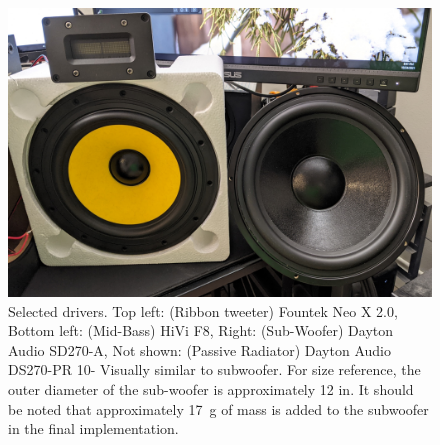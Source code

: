 \documentclass{StdTemplate} %
\begin{document}
\begin{figure}[h!]
\centering
\includegraphics[width = 5.3 in]{Images/sp_drivers.jpeg}
\caption{Selected drivers. Top left: (Ribbon tweeter) Fountek Neo X 2.0, Bottom left: (Mid-Bass) HiVi F8, Right: (Sub-Woofer) Dayton Audio SD270-A, Not shown: (Passive Radiator) Dayton Audio DS270-PR 10- Visually similar to subwoofer. For size reference, the outer diameter of the sub-woofer is approximately 12 in. It should be noted that approximately \SI{17}{\gram} of mass is added to the subwoofer in the final implementation.}
\label{fig:sp_drivers}
\end{figure}
%
\end{document}
